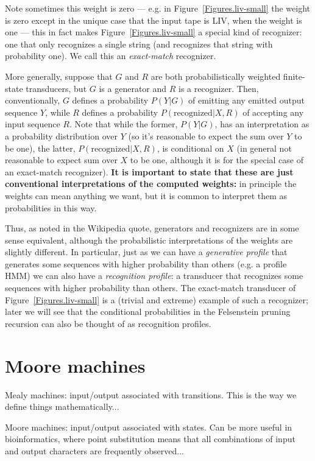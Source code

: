 \documentclass{article}
\newcommand{\figref}[1]{Figure~\ref{Figures.#1}}
\begin{document}
Note sometimes this weight is zero --- e.g. in \figref{liv-small} the weight is zero
except in the unique case that the input tape is LIV, when the weight is one ---
this in fact makes \figref{liv-small} a special kind of recognizer:
one that only recognizes a single string
(and recognizes that string with probability one).
We call this an {\em exact-match} recognizer.

More generally, suppose that $G$ and $R$ are both probabilistically weighted finite-state transducers,
but $G$ is a generator and $R$ is a recognizer.
Then, conventionally, $G$ defines a probability $P(Y|G)$ of emitting any emitted output sequence $Y$,
while $R$ defines a probability $P(\mbox{recognized}|X,R)$ of accepting any input sequence $R$.
Note that while the former, $P(Y|G)$, has an interpretation as a probability distribution over $Y$
(so it's reasonable to expect the sum over $Y$ to be one),
the latter, $P(\mbox{recognized}|X,R)$, is conditional on $X$
(in general not reasonable to expect sum over $X$ to be one,
although it is for the special case of an exact-match recognizer).
{\bf It is important to state that these are just conventional interpretations of the computed weights:}
in principle the weights can mean anything we want,
but it is common to interpret them as probabilities in this way.

Thus, as noted in the Wikipedia quote, generators and recognizers are in some sense equivalent,
although the probabilistic interpretations of the weights are slightly different.
In particular, just as we can have a {\em generative profile}
that generates some sequences with higher probability than others (e.g. a profile HMM)
we can also have a {\em recognition profile}: a transducer
that recognizes some sequences with higher probability than others.
The exact-match transducer of \figref{liv-small} is a (trivial and extreme) example of such a recognizer;
later we will see that the conditional probabilities in the Felsenstein pruning recursion can also
be thought of as recognition profiles.

\section{Moore machines}

Mealy machines: input/output associated with transitions.
This is the way we define things mathematically...

Moore machines: input/output associated with states.
Can be more useful in bioinformatics,
where point substitution means that all combinations of input and output characters are frequently observed...
\end{document}
